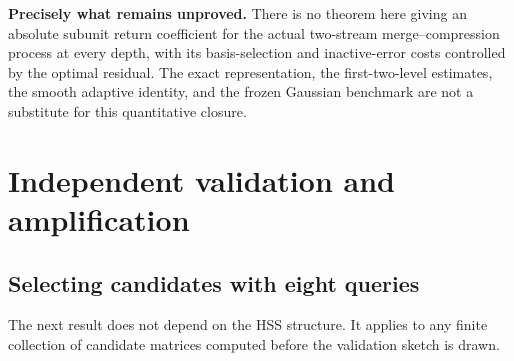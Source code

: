 \documentclass[11pt,oneside,openany,a4paper]{book}
\numberwithin{equation}{chapter}
\theoremstyle{definition}
\theoremstyle{remark}
\begin{document}
\begin{statusbox}
\textbf{Precisely what remains unproved.}
There is no theorem here giving an absolute subunit return coefficient for
the actual two-stream merge--compression process at every depth, with its
basis-selection and inactive-error costs controlled by the optimal
residual. The exact representation, the first-two-level estimates, the
smooth adaptive identity, and the frozen Gaussian benchmark are not a
substitute for this quantitative closure.
\end{statusbox}

\section{Independent validation and amplification}\label{base:sec:validation}
\subsection{Selecting candidates with eight queries}
The next result does not depend on the HSS structure. It applies to any
finite collection of candidate matrices computed before the validation
sketch is drawn.
\end{document}
